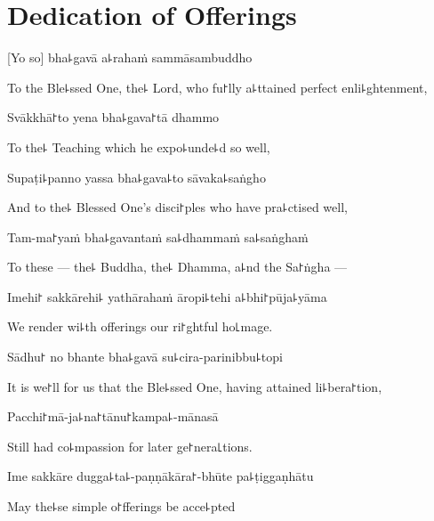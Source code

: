 \chapter{Dedication of Offerings}

[Yo so] bha꜕gavā a꜕rahaṁ sammāsambuddho

\begin{english}
To the Ble꜕ssed One, the꜕ Lord, who fu꜓lly a꜕ttained perfect enli꜕ghtenment,
\end{english}

Svākkhā꜓to yena bha꜕gava꜓tā dhammo

\begin{english}
To the꜕ Teaching which he expo꜕unde꜕d so well,
\end{english}

Supaṭi꜕panno yassa bha꜕gava꜕to sāvaka꜕saṅgho

\begin{english}
And to the꜕ Blessed One's disci꜓ples who have pra꜕ctised well,
\end{english}

Tam-ma꜓yaṁ bha꜕gavantaṁ sa꜕dhammaṁ sa꜕saṅghaṁ

\begin{english}
To these --- the꜕ Buddha, the꜕ Dhamma, a꜕nd the Sa꜓ṅgha ---
\end{english}

Imehi꜓ sakkārehi꜕ yathārahaṁ āropi꜕tehi a꜕bhi꜓pūja꜕yāma

\begin{english}
We render wi꜕th offerings our ri꜓ghtful ho꜖mage.
\end{english}

Sādhu꜓ no bhante bha꜕gavā su꜕cira-parinibbu꜕topi

\begin{english}
It is we꜓ll for us that the Ble꜕ssed One, having attained li꜕bera꜓tion,
\end{english}

Pacchi꜓mā-ja꜕na꜓tānu꜓kampa꜕-mānasā

\begin{english}
Still had co꜕mpassion for later ge꜓nera꜖tions.
\end{english}

Ime sakkāre dugga꜕ta꜕-paṇṇākāra꜓-bhūte pa꜕ṭiggaṇhātu

\begin{english}
May the꜕se simple o꜓fferings be acce꜕pted
\end{english}

